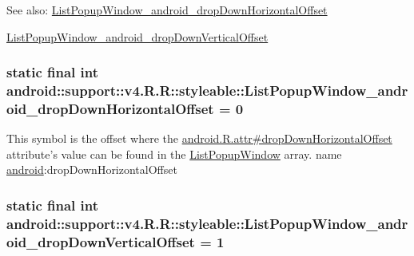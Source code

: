 \begin{Desc}
\item[See also:]\hyperlink{classandroid_1_1support_1_1v4_1_1_r_1_1styleable_2e96b042761bd1aeda203521812c584e}{ListPopupWindow\_\-android\_\-dropDownHorizontalOffset} 

\hyperlink{classandroid_1_1support_1_1v4_1_1_r_1_1styleable_692ddd2493fa2024e43c7709cf955596}{ListPopupWindow\_\-android\_\-dropDownVerticalOffset} \end{Desc}
\hypertarget{classandroid_1_1support_1_1v4_1_1_r_1_1styleable_2e96b042761bd1aeda203521812c584e}{
\subsubsection[{ListPopupWindow\_\-android\_\-dropDownHorizontalOffset}]{\setlength{\rightskip}{0pt plus 5cm}static final int android::support::v4.R.R::styleable::ListPopupWindow\_\-android\_\-dropDownHorizontalOffset = 0}}
\label{classandroid_1_1support_1_1v4_1_1_r_1_1styleable_2e96b042761bd1aeda203521812c584e}


This symbol is the offset where the \hyperlink{}{android.R.attr\#dropDownHorizontalOffset} attribute's value can be found in the \hyperlink{classandroid_1_1support_1_1v4_1_1_r_1_1styleable_a0e1ff67246990456b474c947ecb8b7e}{ListPopupWindow} array.  name \hyperlink{namespaceandroid}{android}:dropDownHorizontalOffset \hypertarget{classandroid_1_1support_1_1v4_1_1_r_1_1styleable_692ddd2493fa2024e43c7709cf955596}{
\subsubsection[{ListPopupWindow\_\-android\_\-dropDownVerticalOffset}]{\setlength{\rightskip}{0pt plus 5cm}static final int android::support::v4.R.R::styleable::ListPopupWindow\_\-android\_\-dropDownVerticalOffset = 1}}
\label{classandroid_1_1support_1_1v4_1_1_r_1_1styleable_692ddd2493fa2024e43c7709cf955596}


